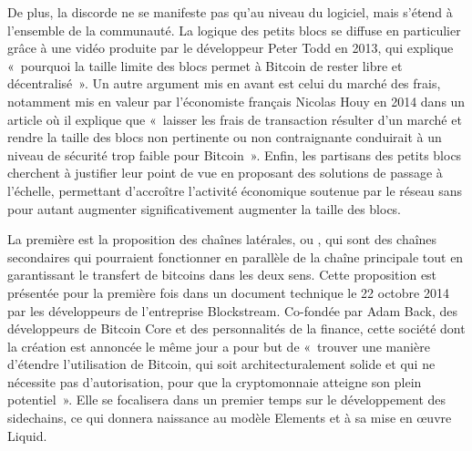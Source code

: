 De plus, la discorde ne se manifeste pas qu'au niveau du logiciel, mais s'étend à l'ensemble de la communauté. La logique des petits blocs se diffuse en particulier grâce à une vidéo produite par le développeur Peter Todd en 2013, qui explique «~pourquoi la taille limite des blocs permet à Bitcoin de rester libre et décentralisé~». Un autre argument mis en avant est celui du marché des frais, notamment mis en valeur par l'économiste français Nicolas Houy en 2014 dans un article où il explique que «~laisser les frais de transaction résulter d’un marché et rendre la taille des blocs non pertinente ou non contraignante conduirait à un niveau de sécurité trop faible pour Bitcoin~». Enfin, les partisans des petits blocs cherchent à justifier leur point de vue en proposant des solutions de passage à l'échelle, permettant d'accroître l'activité économique soutenue par le réseau sans pour autant augmenter significativement augmenter la taille des blocs.

La première est la proposition des chaînes latérales, ou , qui sont des chaînes secondaires qui pourraient fonctionner en parallèle de la chaîne principale tout en garantissant le transfert de bitcoins dans les deux sens. Cette proposition est présentée pour la première fois dans un document technique le 22 octobre 2014 par les développeurs de l'entreprise Blockstream. Co-fondée par Adam Back, des développeurs de Bitcoin Core et des personnalités de la finance, cette société dont la création est annoncée le même jour a pour but de «~trouver une manière d'étendre l'utilisation de Bitcoin, qui soit architecturalement solide et qui ne nécessite pas d'autorisation, pour que la cryptomonnaie atteigne son plein potentiel~». Elle se focalisera dans un premier temps sur le développement des sidechains, ce qui donnera naissance au modèle Elements et à sa mise en œuvre Liquid.



